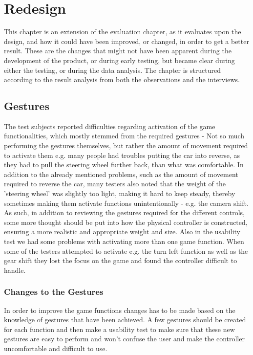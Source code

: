 \section{Redesign} \label{sec:redesign}
This chapter is an extension of the evaluation chapter, as it evaluates upon the design, and how it could have been improved, or changed, in order to get a better result. These are the changes that might not have been apparent during the development of the product, or during early testing, but became clear during either the testing, or during the data analysis. The chapter is structured according to the result analysis from both the observations and the interviews.

\subsection{Gestures}
The test subjects reported difficulties regarding activation of the game functionalities, which mostly stemmed from the required gestures - Not so much performing the gestures themselves, but rather the amount of movement required to activate them e.g. many people had troubles putting the car into reverse, as they had to pull the steering wheel further back, than what was comfortable.
In addition to the already mentioned problems, such as the amount of movement required to reverse the car, many testers also noted that the weight of the 'steering wheel' was slightly too light, making it hard to keep steady, thereby sometimes making them activate functions unintentionally - e.g. the camera shift.
As such, in addition to reviewing the gestures required for the different controls, some more thought should be put into how the physical controller is constructed, ensuring a more realistic and appropriate weight and size.
Also in the usability test we had some problems with activating more than one game function. When some of the testers attempted to activate e.g. the turn left function as well as the gear shift they lost the focus on the game and found the controller difficult to handle.

\subsubsection*{Changes to the Gestures}
In order to improve the game functions changes has to be made based on the knowledge of gestures that have been achieved. A few gestures should be created for each function and then make a usability test to make sure that these new gestures are easy to perform and won’t confuse the user and make the controller uncomfortable and difficult to use.


